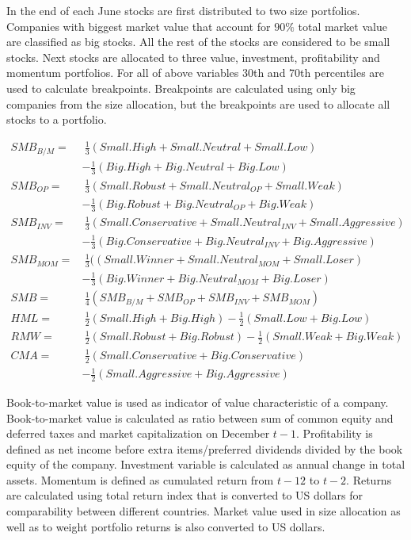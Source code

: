 \documentclass{article}
\begin{document}
In the end of each June stocks are first distributed to two size portfolios. Companies with biggest market value that account for $90\%$ total market value are classified as big stocks. All the rest of the stocks are considered to be small stocks. Next stocks are allocated to three value, investment, profitability and momentum portfolios. For all of above variables 30th and 70th percentiles are used to calculate breakpoints. Breakpoints are calculated using only big companies from the size allocation, but the breakpoints are used to allocate all stocks to a portfolio.

\begin{equation} \label{eq:FF6factors}
\begin{split}
SMB_{B/M} = & \ \frac{1}{3} (Small.High + Small.Neutral + Small.Low) \\
			& - \frac{1}{3} (Big.High + Big.Neutral + Big.Low) \\[5pt]
SMB_{OP} = & \ \frac{1}{3} (Small.Robust + Small.Neutral_{OP} + Small.Weak)\\
			& - \frac{1}{3} (Big.Robust + Big.Neutral_{OP} + Big.Weak)\\[5pt]
SMB_{INV} = & \ \frac{1}{3} (Small.Conservative + Small.Neutral_{INV} + Small.Aggressive)\\
			& - \frac{1}{3} (Big.Conservative + Big.Neutral_{INV} + Big.Aggressive)\\[5pt]
SMB_{MOM} = & \ \frac{1}{3} ((Small.Winner + Small.Neutral_{MOM} + Small.Loser)\\
		     	& - \frac{1}{3} (Big.Winner + Big.Neutral_{MOM} + Big.Loser)\\[5pt]
SMB = & \ \frac{1}{4} (SMB_{B/M} + SMB_{OP} + SMB_{INV} + SMB_{MOM})\\[20pt]
HML = & \ \frac{1}{2} (Small.High + Big.High) - \frac{1}{2} (Small.Low + Big.Low)\\[5pt]
RMW = & \ \frac{1}{2} (Small.Robust + Big.Robust) - \frac{1}{2} (Small.Weak + Big.Weak)\\[5pt]
CMA = & \ \frac{1}{2} (Small.Conservative + Big.Conservative)\\
		& - \frac{1}{2} (Small.Aggressive + Big.Aggressive)
\end{split}
\end{equation}

Book-to-market value is used as indicator of value characteristic of a company. Book-to-market value is calculated as ratio between sum of common equity and deferred taxes and market capitalization on December $t-1$. Profitability is defined as net income before extra items/preferred dividends divided by the book equity of the company. Investment variable is calculated as annual change in total assets. Momentum is defined as cumulated return from $t-12$ to $t-2$. Returns are calculated using total return index that is converted to US dollars for comparability between different countries. Market value used in size allocation as well as to weight portfolio returns is also converted to US dollars. 
\end{document}
